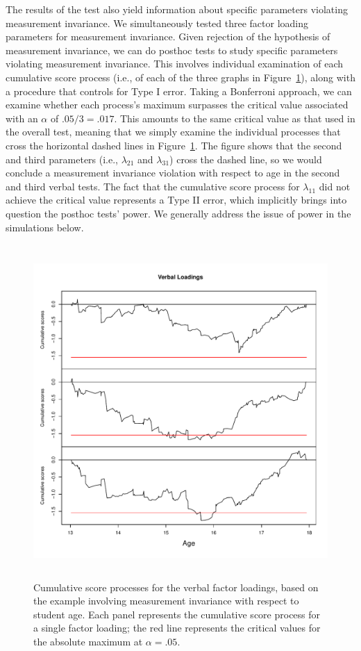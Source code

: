 \documentclass[man]{apa}
\begin{document}
The results of the test also yield information about specific
parameters violating measurement invariance.  We simultaneously tested
three factor loading parameters for measurement invariance.  Given
rejection of the hypothesis of measurement invariance, we can 
do posthoc 
tests to study specific parameters violating measurement invariance.
This involves individual examination of each cumulative score process
(i.e., of each of the three graphs in Figure~\ref{fig:cusumex}),
along with a procedure that controls for Type I error.  Taking a
Bonferroni approach, we can examine whether each process's maximum
surpasses the critical value associated with an $\alpha$ of
$.05/3=.017$.  This amounts to the same critical value as that used in
the overall test, 
meaning that we simply examine the individual processes that cross
the horizontal dashed lines in Figure~\ref{fig:cusumex}.  The figure
shows that the second and third parameters (i.e., $\lambda_{21}$ and
$\lambda_{31}$) cross the dashed line, so we would conclude a measurement
invariance violation with respect to age in the second and third
verbal tests.  The fact that the cumulative score process for
$\lambda_{11}$ did not achieve the critical value represents a Type II
error, which implicitly brings into question the posthoc tests' power.  We
generally address the issue of power in the simulations below.

\begin{figure}
\caption{Cumulative score processes for the verbal factor loadings,
  based on the example involving measurement invariance with respect
  to student age.  Each panel represents the cumulative score process
  for a single factor loading; the red line represents the critical values for 
  the absolute maximum at $\alpha=.05$.}
\label{fig:cusumex}
\includegraphics[height=5in]{example.pdf}
\end{figure}
\end{document}
